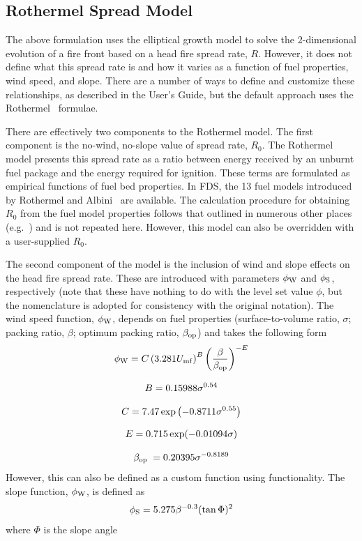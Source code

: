 \subsection{Rothermel Spread Model}

The above formulation uses the elliptical growth model to solve the 2-dimensional evolution of a fire front based on a head fire spread rate, $R$. However, it does not define what this spread rate is and how it varies as a function of fuel properties, wind speed, and slope. There are a number of ways to define and customize these relationships, as described in the User's Guide, but the default approach uses the Rothermel~\cite{Rothermel:1972,Albini:1976} formulae. 

There are effectively two components to the Rothermel model. The first component is the no-wind, no-slope value of spread rate, $R_0$. The Rothermel model presents this spread rate as a ratio between energy received by an unburnt fuel package and the energy required for ignition. These terms are formulated as empirical functions of fuel bed properties. In FDS, the 13 fuel models introduced by Rothermel and Albini~\cite{Rothermel:1972,Albini:1976} are available. The calculation procedure for obtaining $R_0$ from the fuel model properties follows that outlined in numerous other places (e.g.~\cite{Rothermel:1972,Wilson:1980}) and is not repeated here. However, this model can also be overridden with a user-supplied $R_0$.

The second component of the model is the inclusion of wind and slope effects on the head fire spread rate. These are introduced with parameters $\phi_{\rm W}$ and $\phi_{\rm S}$, respectively (note that these have nothing to do with the level set value $\phi$, but the nomenclature is adopted for consistency with the original notation). The wind speed function, $\phi_{\rm W}$, depends on fuel properties (surface-to-volume ratio, $\sigma$; packing ratio, $\beta$; optimum packing ratio, $\beta_{\rm op}$) and takes the following form
\begin{gather}
\phi_{\rm W} = C\left(3.281 U_{\rm mf}\right)^{B}\left(\frac{\beta}{\beta_{\rm op}}\right)^{-E} 
\label{eq:roth_wind} \\[8pt]
B = 0.15988 \sigma^{0.54} \\[8pt]
C = 7.47 \exp \left(-0.8711 \sigma^{0.55}\right) \\[8pt]
E = 0.715 \exp (-0.01094 \sigma) \\[8pt]
\beta_{\text {op }} = 0.20395 \sigma^{-0.8189}
\end{gather}
However, this can also be defined as a custom function using  functionality. The slope function, $\phi_{\rm W}$, is defined as
\begin{equation}
\phi_{\rm S} = 5.275 \beta^{-0.3}(\tan \Phi)^{2} \label{eq:roth_slope}
\end{equation}
where $\Phi$ is the slope angle

